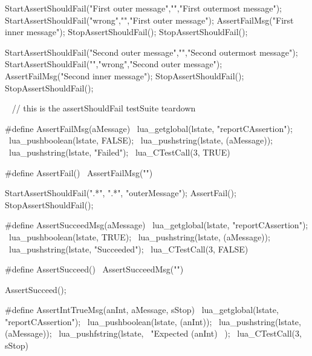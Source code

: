 \startCTest
StartAssertShouldFail("First outer message","","First outermost message");
StartAssertShouldFail("wrong","","First outer message");
  AssertFailMsg("First inner message");
StopAssertShouldFail();
StopAssertShouldFail();

StartAssertShouldFail("Second outer message","","Second outermost message");
StartAssertShouldFail("","wrong","Second outer message");
  AssertFailMsg("Second inner message");
StopAssertShouldFail();
StopAssertShouldFail();
\stopCTest
\stopTestCase

\CTestsSuiteTeardown\
\startCTest
  // this is the assertShouldFail testSuite teardown
\stopCTest

\stopTestSuite

\startTestSuite[assertFail]

\startCHeader
#define AssertFailMsg(aMessage)              \
  lua_getglobal(lstate, "reportCAssertion"); \
  lua_pushboolean(lstate, FALSE);            \
  lua_pushstring(lstate, (aMessage));        \
  lua_pushstring(lstate, "Failed");          \
  lua_CTestCall(3, TRUE)
  
#define AssertFail() \
  AssertFailMsg("")
\stopCHeader

\startTestCase[assertFail should always fail]

\startCTest
  StartAssertShouldFail(".*", ".*", "outerMessage");
    AssertFail();
  StopAssertShouldFail();
\stopCTest

\stopTestCase

\stopTestSuite

\startTestSuite[assertSucceed]

\startCHeader
#define AssertSucceedMsg(aMessage)           \
  lua_getglobal(lstate, "reportCAssertion"); \
  lua_pushboolean(lstate, TRUE);             \
  lua_pushstring(lstate, (aMessage));        \
  lua_pushstring(lstate, "Succeeded");       \
  lua_CTestCall(3, FALSE)

#define AssertSucceed() \
  AssertSucceedMsg("")
\stopCHeader


\startCTest
  AssertSucceed();
\stopCTest
\stopTestCase

\stopTestSuite

\startTestSuite[assertIntTrue]

\startCHeader
#define AssertIntTrueMsg(anInt, aMessage, sStop) \
  lua_getglobal(lstate, "reportCAssertion");     \
  lua_pushboolean(lstate, (anInt));              \
  lua_pushstring(lstate, (aMessage));            \
  lua_pushfstring(lstate,                        \
      "Expected %
      (anInt)                                    \
    );                                           \
  lua_CTestCall(3, sStop)

